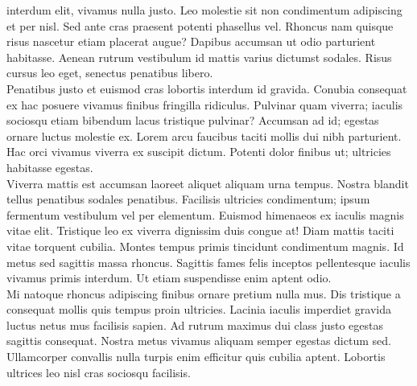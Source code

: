 \documentclass{article}
\begin{document}
interdum elit, vivamus nulla justo. Leo molestie sit non condimentum adipiscing et per nisl. Sed ante cras praesent potenti phasellus vel. Rhoncus nam quisque risus nascetur etiam placerat augue? Dapibus accumsan ut odio parturient habitasse. Aenean rutrum vestibulum id mattis varius dictumst sodales. Risus cursus leo eget, senectus penatibus libero.\\Penatibus justo et euismod cras lobortis interdum id gravida. Conubia consequat ex hac posuere vivamus finibus fringilla ridiculus. Pulvinar quam viverra; iaculis sociosqu etiam bibendum lacus tristique pulvinar? Accumsan ad id; egestas ornare luctus molestie ex. Lorem arcu faucibus taciti mollis dui nibh parturient. Hac orci vivamus viverra ex suscipit dictum. Potenti dolor finibus ut; ultricies habitasse egestas.\\Viverra mattis est accumsan laoreet aliquet aliquam urna tempus. Nostra blandit tellus penatibus sodales penatibus. Facilisis ultricies condimentum; ipsum fermentum vestibulum vel per elementum. Euismod himenaeos ex iaculis magnis vitae elit. Tristique leo ex viverra dignissim duis congue at! Diam mattis taciti vitae torquent cubilia. Montes tempus primis tincidunt condimentum magnis. Id metus sed sagittis massa rhoncus. Sagittis fames felis inceptos pellentesque iaculis vivamus primis interdum. Ut etiam suspendisse enim aptent odio.\\Mi natoque rhoncus adipiscing finibus ornare pretium nulla mus. Dis tristique a consequat mollis quis tempus proin ultricies. Lacinia iaculis imperdiet gravida luctus netus mus facilisis sapien. Ad rutrum maximus dui class justo egestas sagittis consequat. Nostra metus vivamus aliquam semper egestas dictum sed. Ullamcorper convallis nulla turpis enim efficitur quis cubilia aptent. Lobortis ultrices leo nisl cras sociosqu facilisis.
\end{document}
